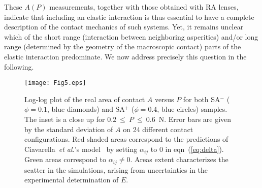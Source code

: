 \documentclass[pre,groupedaddress,showkeys,showpacs,twocolumn]{revtex4}
\begin{document}
These $A(P)$ measurements, together with those obtained with RA lenses, indicate that including an elastic interaction is thus essential to have a complete description of the contact mechanics of such systems. Yet, it remains unclear which of the short range (interaction between neighboring asperities) and/or long range (determined by the geometry of the macroscopic contact) parts of the elastic interaction predominate. We now address precisely this question in the following.\\
%
\begin{figure}
	\texttt{[image: Fig5.eps]}
	\caption{Log-log plot of the real area of contact $A$ versus $P$ for both SA$^{-}$ ($\phi=0.1$, blue diamonds) and SA$^{+}$ ($\phi=0.4$, blue circles) samples. The inset is a close up for $0.2~\leq~P~\leq~0.6$~N. Error bars are given by the standard deviation of $A$ on 24 different contact configurations. Red shaded areas correspond to the predictions of Ciavarella~\textit{et al.}'s model~\cite{ciavarella2006,ciavarella2008} by setting $\alpha_{ij}$ to 0 in eqn~(\ref{eq:delta}). Green areas correspond to $\alpha_{ij} \neq 0$. Areas extent characterizes the scatter in the simulations, arising from uncertainties in the experimental determination of $E$.}
	\label{fig:contact_areaSA} 
\end{figure}
%
\end{document}
